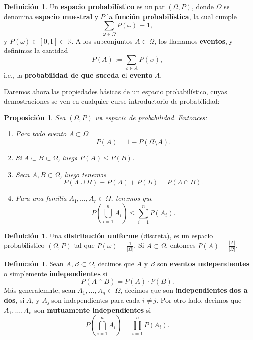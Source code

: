 \documentclass[12pt]{report}
\theoremstyle{plain}
\newtheorem{proposition}[theorem]{Proposición}
\theoremstyle{definition}
\newtheorem{definition}[theorem]{Definición}
\newcommand{\reals}{\mathbb{R}}
\newcommand{\abs}[1]{\left \vert #1 \right \vert}
\begin{document}
\begin{definition}
Un \textbf{espacio probabilístico} es un par $(\Omega, P)$, donde $\Omega$ se denomina \textbf{espacio muestral} y $P$ la \textbf{función probabilística}, la cual cumple
\[
    \sum_{\omega \in \Omega} P(\omega) = 1,
\]
y $P(\omega) \in [0,1] \subset \reals$. A los subconjuntos $A \subset \Omega$, los llamamos \textbf{eventos}, y definimos la cantidad
\[
    P(A) := \sum_{\omega \in A} P (w),
\]
i.e., la \textbf{probabilidad de que suceda el evento $A$}.
\end{definition}

Daremos ahora las propiedades básicas de un espacio probabilístico, cuyas demostraciones se ven en cualquier curso introductorio de probabilidad:
\begin{proposition}
Sea $(\Omega, P)$ un espacio de probabilidad. Entonces:
\begin{enumerate}[(1)]
\item Para todo evento $A \subset \Omega$
\[
    P(A) = 1 - P (\Omega \setminus A).
\]
\item Si $A \subset B \subset \Omega$, luego $P(A) \leq P(B)$.
\item Sean $A,B \subset \Omega$, luego tenemos
\[
    P(A \cup B) = P(A) + P(B) - P(A \cap B).
\]
\item Para una familia $A_1, \ldots, A_r \subset \Omega$, tenemos que
\[
    P(\bigcup_{i = 1}^n A_i) \leq \sum_{i = 1}^n P(A_i).
\]
\end{enumerate}
\end{proposition}

\begin{definition}
Una \textbf{distribución uniforme} (discreta), es un espacio probabilístico $(\Omega, P)$ tal que $P (\omega) = \frac{1}{\abs \Omega}$. Si $A \subset \Omega$, entonces $P(A) = \frac{\abs A}{\abs \Omega}$.
\end{definition}

\begin{definition}
Sean $A,B \subset \Omega$, decimos que $A$ y $B$ son \textbf{eventos independientes} o simplemente \textbf{independientes} si
\[
    P(A \cap B) = P(A) \cdot P(B).
\]
Más generalemnte, sean $A_1, \ldots, A_n \subset \Omega$, decimos que son \textbf{independientes dos a dos}, si $A_i $ y $A_j$ son independientes para cada $i \neq j$. Por otro lado, decimos que $A_1, \ldots, A_n$ son \textbf{mutuamente independientes} si
\[
    P(\bigcap_{i = 1}^n A_i) = \prod_{i = 1}^n P(A_i).
\]
\end{definition}
\end{document}
